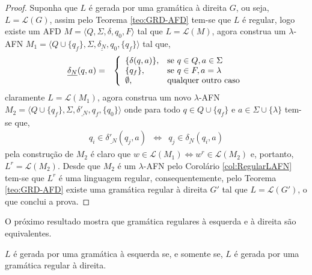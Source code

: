 \begin{proof}
	Suponha que $L$ é gerada por uma gramática à direita $G$, ou seja, $L = \mathcal{L}(G)$, assim pelo Teorema \ref{teo:GRD-AFD} tem-se que $L$ é regular, logo existe um AFD $M = \langle Q, \Sigma, \delta, q_0, F\rangle$ tal que $L = \mathcal{L}(M)$, agora construa um $\lambda$-AFN $M_1 = \langle Q \cup \{q_f\}, \Sigma, \underline{\delta_N}, q_0, \{q_f\}\rangle$ tal que,
	\begin{eqnarray*}
		\underline{\delta_N}(q, a) & = & \left\{\begin{array}{ll}	
			\{\delta(q, a)\}, & \hbox{se } q \in Q, a \in \Sigma\\
			\{q_f\}, & \hbox{se } q \in F, a = \lambda \\
			\emptyset, & \hbox{qualquer outro caso}
		\end{array}\right.
	\end{eqnarray*}
	claramente $L = \mathcal{L}(M_1)$, agora construa um novo $\lambda$-AFN $M_2 = \langle Q \cup \{q_f\}, \Sigma, \underline{\delta'_N}, q_f, \{q_0\}\rangle$ onde para todo $q \in Q \cup \{q_f\}$ e $a \in \Sigma \cup \{\lambda\}$ tem-se que,
	\begin{eqnarray*}
		q_i \in \underline{\delta'_N}(q_j, a) & \Longleftrightarrow & q_j \in \underline{\delta_N}(q_i, a)
	\end{eqnarray*}
	pela construção de $M_2$ é claro que  $w \in \mathcal{L}(M_1) \Longleftrightarrow w^r \in \mathcal{L}(M_2)$ e, portanto, $L^r = \mathcal{L}(M_2)$. Desde que $M_2$ é um $\lambda$-AFN pelo Corolário \ref{col:RegularLAFN} tem-se que $L^r$ é uma linguagem regular, consequentemente, pelo Teorema \ref{teo:GRD-AFD} existe uma gramática regular à direita $G'$ tal que $L = \mathcal{L}(G')$, o que conclui a prova.
\end{proof}

O próximo resultado mostra que gramática regulares à esquerda e à direita são equivalentes.

\begin{teorema}\label{teo:MudacaDeLadoGramatica}
	$L$ é gerada por uma gramática à esquerda se, e somente se, $L$ é gerada por uma gramática regular à direita.
\end{teorema}

